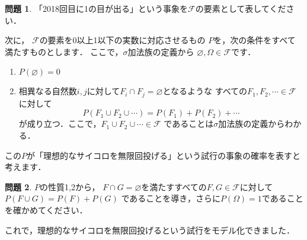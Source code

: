 \documentclass[./main]{subfiles} %
\theoremstyle{definition}
\newtheorem{hamadadefi}{定義}[Section]
\newtheorem{hamadaqst}[hamadadefi]{問題}
\newtheorem{hamadaprop}[hamadadefi]{命題}
\begin{document}

\begin{hamadaqst}\label{checkofsigmaalgebra}
「2018回目に1の目が出る」という事象を$\mathcal{F}$の要素として表してください．
\end{hamadaqst}

次に，
$\mathcal{F}$の要素を0以上1以下の実数に対応させるもの
$P$を，次の条件をすべて満たすものとします．
ここで，$\sigma$加法族の定義から
$\varnothing,\Omega\in\mathcal{F}$です．
\begin{enumerate}
\item $P(\varnothing)=0$
\item 相異なる自然数$i,j$に対して$F_i\cap F_j=\varnothing$となるような
すべての$F_1,F_2,\cdots\in\mathcal{F}$に対して
\[ P(F_1\cup F_2\cup\cdots)=P(F_1)+P(F_2)+\cdots \]
が成り立つ．ここで，$F_1\cup F_2\cup\cdots\in\mathcal{F}$
であることは$\sigma$加法族の定義からわかる．
\end{enumerate}
この$P$が「理想的なサイコロを無限回投げる」という試行の事象の確率を表すと考えます．

\begin{hamadaqst}\label{checkofadditivity}
$P$の性質1,2から，
$F\cap G=\varnothing$を満たすすべての$F,G\in\mathcal{F}$に対して
$P(F\cup G)=P(F)+P(G)$
であることを導き，さらに$P(\Omega)=1$であることを確かめてください．
\end{hamadaqst}

これで，理想的なサイコロを無限回投げるという試行をモデル化できました．

\end{document}
